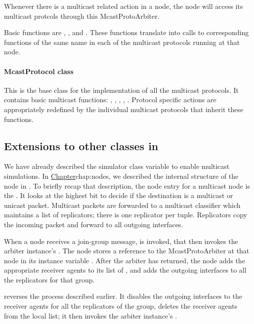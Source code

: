 Whenever there is a multicast related action in a node, the
node will access its multicast protcols through this McastProtoArbiter.

Basic functions are , , and
.
These functions translate into calls to corresponding functions of the
same name in each of the multicast protocols running at that node.

\paragraph{McastProtocol class}
This is the base class for the implementation of all the multicast protocols.
It contains basic multicast functions:
, ,
, , .
Protocol specific actions are appropriately redefined
by the individual multicast protocols that inherit these functions.

\subsection{Extensions to other classes in \ns}
We have already described the simulator class variable
 to enable multicast simulations.
In 
\href{the earlier chapter describing nodes in \ns}{Chapter}{chap:nodes},
we described the internal structure of the node in \ns.
To briefly recap that description, the node entry for a multicast node is
the .  It looks at the highest bit to decide
 if the destination is a multicast or unicast packet.
 Multicast packets are forwarded to a multicast
classifier which maintains a list of replicators;
there is one replicator per  tuple.
Replicators copy the incoming packet and forward to all outgoing interfaces.

When a node receives a join-group message,
 is invoked, that then invokes
the arbiter instance's
.
The node stores a reference to the McastProtoArbiter at that node in
its instance variable .
After the arbiter has returned, the node
adds the appropriate receiver agents to its list of ,
and adds the outgoing interfaces to all the replicators for that group.

 reverses the process described earlier.
It disables the outgoing interfaces to the receiver agents
for all the replicators of the group,
deletes the receiver agents from the local  list; it then
invokes the arbiter instance's 
.

